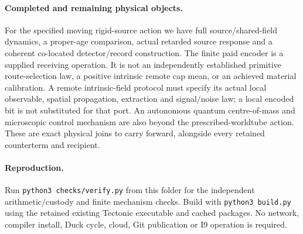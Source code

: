 \paragraph{Completed and remaining physical objects.}
For the specified moving rigid-source action we have full source/shared-field
dynamics, a proper-age comparison, actual retarded source response and a
coherent co-located detector/record construction. The finite paid encoder
is a supplied receiving operation. It is not an independently established
primitive route-selection law, a positive intrinsic remote cap mean,
or an achieved material calibration. A remote intrinsic-field protocol
must specify its actual local observable, spatial propagation, extraction
and signal/noise law; a local encoded bit is not substituted for that port.
An autonomous quantum centre-of-mass and microscopic control mechanism
are also beyond the prescribed-worldtube action. These are exact physical
joins to carry forward, alongside every retained counterterm and recipient.

\paragraph{Reproduction.}
Run \texttt{python3 checks/verify.py} from this folder for the independent
arithmetic/custody and finite mechanism checks. Build with
\texttt{python3 build.py} using the retained existing Tectonic executable
and cached packages. No network, compiler install, Duck cycle, cloud,
Git publication or I9 operation is required.
\FloatBarrier

